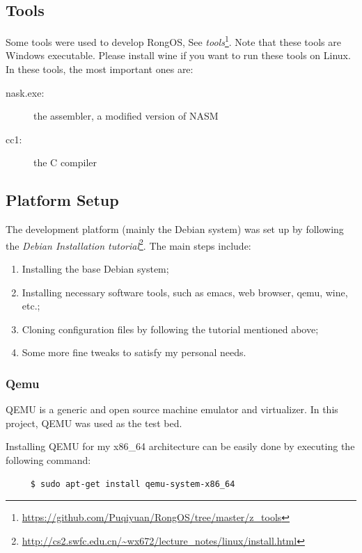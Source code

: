 \documentclass{swfcthesis}
\begin{document}
\subsection{Tools}

Some tools were used to develop RongOS, See \emph{tools}\footnote{\url{https://github.com/Puqiyuan/RongOS/tree/master/z_tools}}. Note that
these tools are Windows executable. Please install wine if you want to run these tools on
Linux. In these tools, the most important ones are:

\begin{description}
\item[nask.exe:] the assembler, a modified version of NASM\cite{30_os}
\item[cc1:] the C compiler
\end{description}

\subsection{Platform Setup}

The development platform (mainly the Debian system) was set up by following the
\emph{Debian Installation
  tutorial}\footnote{\url{http://cs2.swfc.edu.cn/~wx672/lecture_notes/linux/install.html}}. The
main steps include:
\begin{enumerate}
\item Installing the base Debian system;
\item Installing necessary software tools, such as emacs, web browser, qemu, wine, etc.;
\item Cloning configuration files by following the tutorial mentioned above;
\item Some more fine tweaks to satisfy my personal needs.
\end{enumerate}

\subsubsection{Qemu}

QEMU is a generic and open source machine emulator and virtualizer\cite{wiki:qemu}. In
this project, QEMU was used as the test bed.

Installing QEMU for my x86\_64 architecture can be easily done by executing the following
command:
\begin{verbatim}
     $ sudo apt-get install qemu-system-x86_64
\end{verbatim}
\end{document}

